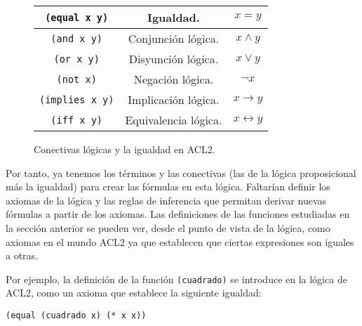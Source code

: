 \documentclass[a4paper,10pt]{article}
\begin{document}
\par\vspace{10pt}

\begin{figure}[ht]
\begin{center}
\begin{tabular}{||c|c|c||}
\hline
\texttt{(equal x y)} & Igualdad. & $x = y$\\
\hline
\texttt{(and x y)} & Conjunción lógica. & $x \wedge y$\\
\hline
\texttt{(or x y)} & Disyunción lógica. & $x \vee y$\\
\hline
\texttt{(not x)} & Negación lógica. & $\neg x$\\
\hline
\texttt{(implies x y)} & Implicación lógica. & $x \to y$\\
\hline
\texttt{(iff x y)} & Equivalencia lógica. & $x \leftrightarrow y$\\
\hline
\end{tabular}
\end{center}
\caption{Conectivas lógicas y la igualdad en ACL2.}
\end{figure}

\par\vspace{10pt}

Por tanto, ya tenemos los términos y las conectivas (las de la lógica proposicional más la igualdad) para crear las fórmulas en esta lógica. Faltarían definir los axiomas de la lógica y las reglas de inferencia que permitan derivar nuevas fórmulas a partir de los axiomas. Las definiciones de las funciones estudiadas en la sección anterior se pueden ver, desde el punto de vista de la lógica, como axiomas en el mundo ACL2 ya que establecen que ciertas expresiones son iguales a otras.

\par\vspace{10pt}

Por ejemplo, la definición de la función \texttt{(cuadrado)} se introduce en la lógica de ACL2, como un axioma que establece la siguiente igualdad:

\par\vspace{10pt}

\begin{lstlisting}[language=clips]
(equal (cuadrado x) (* x x))
\end{lstlisting}

\par\vspace{10pt}
\end{document}
